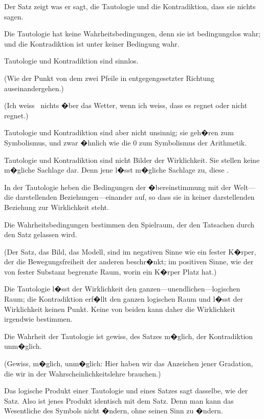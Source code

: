 {Der Satz zeigt was er sagt, die Tautologie und
die Kontradiktion, dass sie nichts sagen.

Die Tautologie hat keine Wahrheitsbedingungen,
denn sie ist bedingungslos wahr; und
die Kontradiktion ist unter keiner Bedingung
wahr.

Tautologie und Kontradiktion sind sinnlos.

(Wie der Punkt von dem zwei Pfeile in
entgegengesetzter Richtung auseinandergehen.)

(Ich weiss \zumBeispiel\ nichts �ber das Wetter, wenn
ich weiss, dass es regnet oder nicht regnet.)}


{Tautologie und Kontradiktion sind aber nicht
unsinnig; sie geh�ren zum Symbolismus, und
zwar �hnlich wie die \glqq{}0\grqq{} zum Symbolismus der
Arithmetik.}


{Tautologie und Kontradiktion sind nicht Bilder
der Wirklichkeit. Sie stellen keine m�gliche
Sachlage dar. Denn jene l�sst  m�gliche
Sachlage zu, diese .

In der Tautologie heben die Bedingungen der
�bereinstimmung mit der Welt---die darstellenden
Beziehungen---einander auf, so dass sie in keiner
darstellenden Beziehung zur Wirklichkeit steht.}


{Die Wahrheitsbedingungen bestimmen den
Spielraum, der den Tatsachen durch den Satz
gelassen wird.

(Der Satz, das Bild, das Modell, sind im
negativen Sinne wie ein fester K�rper, der die
Bewegungsfreiheit der anderen beschr�nkt; im
positiven Sinne, wie der von fester Substanz
begrenzte Raum, worin ein K�rper Platz hat.)

Die Tautologie l�sst der Wirklichkeit den gan\-zen---un\-end\-li\-chen---lo\-gi\-schen
Raum; die Kontradiktion
erf�llt den ganzen logischen Raum und l�sst
der Wirklichkeit keinen Punkt. Keine von beiden
kann daher die Wirklichkeit irgendwie bestimmen.}


{Die Wahrheit der Tautologie ist gewiss, des
Satzes m�glich, der Kontradiktion unm�glich.

(Gewiss, m�glich, unm�glich: Hier haben wir
das Anzeichen jener Gradation, die wir in der
Wahrscheinlichkeitslehre brauchen.)}


{Das logische Produkt einer Tautologie und
eines Satzes sagt dasselbe, wie der Satz. Also ist
jenes Produkt identisch mit dem Satz. Denn man
kann das Wesentliche des Symbols nicht �ndern,
ohne seinen Sinn zu �ndern.}


